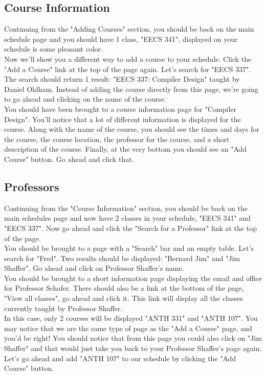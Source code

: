 \documentclass[pdftex,12pt,letter]{article}
\begin{document}
\subsection{Course Information} 
Continuing from the "Adding Courses" section, you should be back on the main schedule page and you should have 1 class, "EECS 341", displayed on your schedule is some pleasant color.\\

Now we'll show you a different way to add a course to your schedule. Click the "Add a Course" link at the top of the page again. Let's search for "EECS 337". The search should return 1 result: "EECS 337: Compiler Design" taught by Daniel Oldham. Instead of adding the course directly from this page, we're going to go ahead and clicking on the name of the course.\\

You should have been brought to a course information page for "Compiler Design". You'll notice that a lot of different information is displayed for the course. Along with the name of the course, you should see the times and days for the course, the course location, the professor for the course, and a short description of the course. Finally, at the very bottom you should see an "Add Course" button. Go ahead and click that.

\subsection{Professors}
Continuing from the "Course Information" section, you should be back on the main schedules page and now have 2 classes in your schedule, "EECS 341" and "EECS 337". Now go ahead and click the "Search for a Professor" link at the top of the page.\\

You should be brought to a page with a "Search" bar and an empty table. Let's search for "Fred". Two results should be displayed: "Bernard Jim" and "Jim Shaffer". Go ahead and click on Professor Shaffer's name.\\

You should be brought to a short information page displaying the email and office for Professor Schafer. There should also be a link at the bottom of the page, "View all classes", go ahead and click it. This link will display all the classes currently taught by Professor Shaffer.\\

In this case, only 2 courses will be displayed "ANTH 331" and "ANTH 107". You may notice that we are the same type of page as the "Add a Course" page, and you'd be right! You should notice that from this page you could also click on "Jim Shaffer" and that would just take you back to your Professor Shaffer's page again. Let's go ahead and add "ANTH 107" to our schedule by clicking the "Add Course" button.\\
\end{document}
